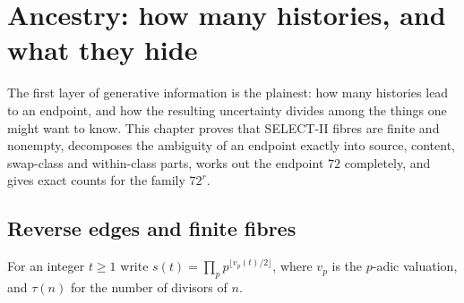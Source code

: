 \chapter{Ancestry: how many histories, and what they hide}\label{ch:ancestry}

The first layer of generative information is the plainest: how many histories lead to an endpoint, and how the resulting uncertainty divides among the things one might want to know. This chapter proves that SELECT-II fibres are finite and nonempty, decomposes the ambiguity of an endpoint exactly into source, content, swap-class and within-class parts, works out the endpoint $72$ completely, and gives exact counts for the family $72^r$.

\section{Reverse edges and finite fibres}
For an integer $t\ge1$ write $s(t)=\prod_p p^{\lfloor v_p(t)/2\rfloor}$, where $v_p$ is the $p$-adic valuation, and $\tau(n)$ for the number of divisors of $n$.

